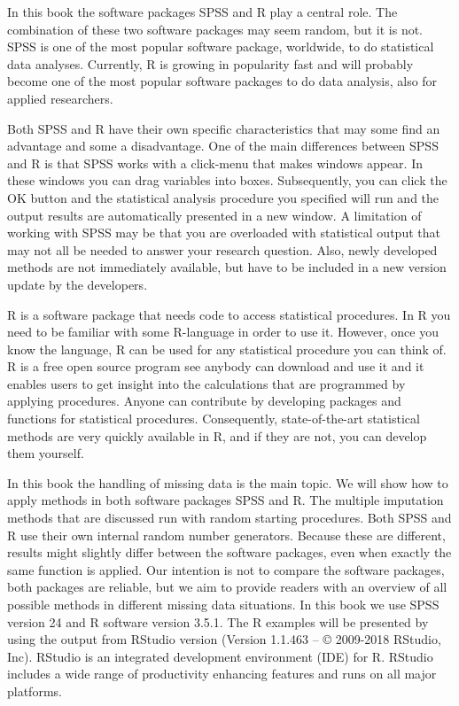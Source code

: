 \documentclass[]{book}
\begin{document}
In this book the software packages SPSS and R play a central role. The
combination of these two software packages may seem random, but it is
not. SPSS is one of the most popular software package, worldwide, to do
statistical data analyses. Currently, R is growing in popularity fast
and will probably become one of the most popular software packages to do
data analysis, also for applied researchers.

Both SPSS and R have their own specific characteristics that may some
find an advantage and some a disadvantage. One of the main differences
between SPSS and R is that SPSS works with a click-menu that makes
windows appear. In these windows you can drag variables into boxes.
Subsequently, you can click the OK button and the statistical analysis
procedure you specified will run and the output results are
automatically presented in a new window. A limitation of working with
SPSS may be that you are overloaded with statistical output that may not
all be needed to answer your research question. Also, newly developed
methods are not immediately available, but have to be included in a new
version update by the developers.

R is a software package that needs code to access statistical
procedures. In R you need to be familiar with some R-language in order
to use it. However, once you know the language, R can be used for any
statistical procedure you can think of. R is a free open source program
see anybody can download and use it and it enables users to get insight
into the calculations that are programmed by applying procedures. Anyone
can contribute by developing packages and functions for statistical
procedures. Consequently, state-of-the-art statistical methods are very
quickly available in R, and if they are not, you can develop them
yourself.

In this book the handling of missing data is the main topic. We will
show how to apply methods in both software packages SPSS and R. The
multiple imputation methods that are discussed run with random starting
procedures. Both SPSS and R use their own internal random number
generators. Because these are different, results might slightly differ
between the software packages, even when exactly the same function is
applied. Our intention is not to compare the software packages, both
packages are reliable, but we aim to provide readers with an overview of
all possible methods in different missing data situations. In this book
we use SPSS version 24 and R software version 3.5.1. The R examples will
be presented by using the output from RStudio version (Version 1.1.463
-- © 2009-2018 RStudio, Inc). RStudio is an integrated development
environment (IDE) for R. RStudio includes a wide range of productivity
enhancing features and runs on all major platforms.
\end{document}

